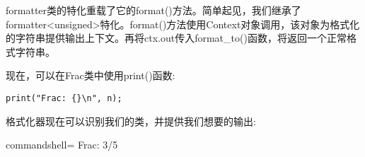 formatter类的特化重载了它的format()方法。简单起见，我们继承了formatter<unsigned>特化。format()方法使用Context对象调用，该对象为格式化的字符串提供输出上下文。再将ctx.out传入format\_to()函数，将返回一个正常格式字符串。

现在，可以在Frac类中使用print()函数:

\begin{lstlisting}[style=styleCXX]
print("Frac: {}\n", n);
\end{lstlisting}

格式化器现在可以识别我们的类，并提供我们想要的输出:

\begin{tcblisting}{commandshell={}}
Frac: 3/5
\end{tcblisting}






